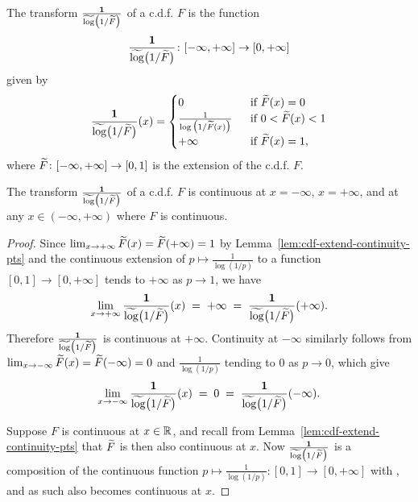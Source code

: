 \begin{definition}
  \label{def:one-div-neg-log-cdf}
  \leanok
  The transform $\frac{\mathbf{1}}{\widetilde{\log} \big( 1 / \widetilde{F} \big)}$ of a c.d.f. $F$ is the function
  \begin{align*}
    \frac{\mathbf{1}}{\widetilde{\log} \big( 1 / \widetilde{F} \big)} \colon [-\infty,+\infty] \to [0,+\infty]
  \end{align*}
  given by
  \begin{align*}
    \frac{\mathbf{1}}{\widetilde{\log} \big( 1 / \widetilde{F} \big)}(x) = \begin{cases}
      0 & \; \text{ if } \widetilde{F}(x) = 0 \\
      \frac{1}{\log \big( 1/\widetilde{F}(x) \big)} & \; \text{ if } 0 < \widetilde{F}(x) < 1 \\
      +\infty & \; \text{ if } \widetilde{F}(x) = 1 ,
      \end{cases}
  \end{align*}
  where $\widetilde{F} \colon [-\infty,+\infty] \to [0,1]$ is the extension of the c.d.f. $F$.
\end{definition}

\begin{lemma}
  \label{lem:one-div-neg-log-cdf-continuity-pts}
  \leanok
  The transform $\frac{\mathbf{1}}{\widetilde{\log} \big( 1 / \widetilde{F} \big)}$ of a c.d.f. $F$ is continuous
  at $x = -\infty$, $x = + \infty$, and at any
  $x \in (-\infty,+\infty)$ where $F$ is continuous.
\end{lemma}
\begin{proof}
  Since $\lim_{x \to +\infty} \widetilde{F}(x) = \widetilde{F}(+\infty) = 1$
  by Lemma~\ref{lem:cdf-extend-continuity-pts} and the continuous extension
  of $p \mapsto \frac{1}{\log(1/p)}$ to a function $[0,1] \to [0,+\infty]$
  tends to $+\infty$ as $p \to 1$, we have
  \begin{align*}
    \lim_{x \to +\infty} \frac{\mathbf{1}}{\widetilde{\log} \big( 1 / \widetilde{F} \big)}(x)
    \; = \; +\infty \; = \; \frac{\mathbf{1}}{\widetilde{\log} \big( 1 / \widetilde{F} \big)}(+\infty) .
  \end{align*}
  Therefore $\frac{\mathbf{1}}{\widetilde{\log} \big( 1 / \widetilde{F} \big)}$ is continuous at $+\infty$.
  Continuity at $-\infty$ similarly follows from
  $\lim_{x \to -\infty} \widetilde{F}(x) = \widetilde{F}(-\infty) = 0$
  and $\frac{1}{\log(1/p)}$ tending to $0$
  as $p \to 0$, which give
  \begin{align*}
    \lim_{x \to -\infty} \frac{\mathbf{1}}{\widetilde{\log} \big( 1 / \widetilde{F} \big)}(x)
    \; = \; 0 \; = \; \frac{\mathbf{1}}{\widetilde{\log} \big( 1 / \widetilde{F} \big)}(-\infty) .
  \end{align*}

  Suppose $F$ is continuous at $x \in \mathbb{R}$,
  and recall from Lemma~\ref{lem:cdf-extend-continuity-pts} that
  $\widetilde{F}$ is then also continuous at $x$.
  Now $\frac{\mathbf{1}}{\widetilde{\log} \big( 1 / \widetilde{F} \big)}$ is a composition of the continuous function
  $p \mapsto \frac{1}{\log(1/p)} \colon [0,1] \to [0,+\infty]$ with
  , and as such also becomes continuous at $x$.
\end{proof}
